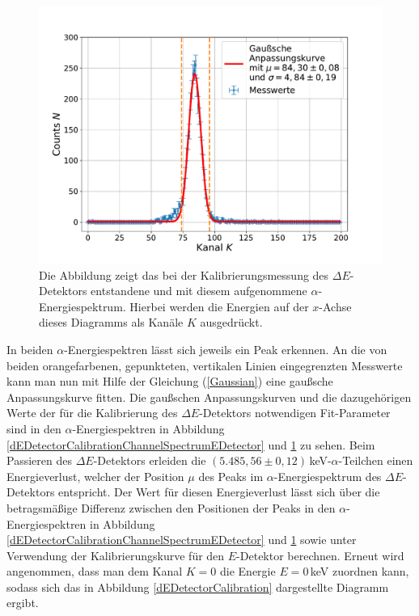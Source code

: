 \begin{figure}[H]
	\centering
	\includegraphics[width=1.0\textwidth]{src/dEDetectorCalibrationChannelSpectrumdEDetector}
	\caption{Die Abbildung zeigt das bei der Kalibrierungsmessung des $\Delta E$-Detektors entstandene und mit diesem aufgenommene $\alpha$-Energiespektrum. Hierbei werden die Energien auf der $x$-Achse dieses Diagramms als Kanäle $K$ ausgedrückt.}
	\label{dEDetectorCalibrationChannelSpectrumdEDetector}
\end{figure}
\noindent In beiden $\alpha$-Energiespektren lässt sich jeweils ein Peak erkennen.
An die von beiden orangefarbenen, gepunkteten, vertikalen Linien eingegrenzten Messwerte kann man nun mit Hilfe der Gleichung (\ref{Gaussian}) eine gaußsche Anpassungskurve fitten.
Die gaußschen Anpassungskurven und die dazugehörigen Werte der für die Kalibrierung des $\Delta E$-Detektors notwendigen Fit-Parameter sind in den $\alpha$-Energiespektren in Abbildung \ref{dEDetectorCalibrationChannelSpectrumEDetector} und \ref{dEDetectorCalibrationChannelSpectrumdEDetector} zu sehen.
Beim Passieren des $\Delta E$-Detektors erleiden die $(5.485,56\pm 0,12)\,$keV-$\alpha$-Teilchen einen Energieverlust, welcher der Position $\mu$ des Peaks im $\alpha$-Energiespektrum des $\Delta E$-Detektors entspricht.
Der Wert für diesen Energieverlust lässt sich über die betragsmäßige Differenz zwischen den Positionen der Peaks in den $\alpha$-Energiespektren in Abbildung \ref{dEDetectorCalibrationChannelSpectrumEDetector} und \ref{dEDetectorCalibrationChannelSpectrumdEDetector} sowie unter Verwendung der Kalibrierungskurve für den $E$-Detektor berechnen.
Erneut wird angenommen, dass man dem Kanal $K=0$ die Energie $E=0\,$keV zuordnen kann, sodass sich das in Abbildung \ref{dEDetectorCalibration} dargestellte Diagramm ergibt.
